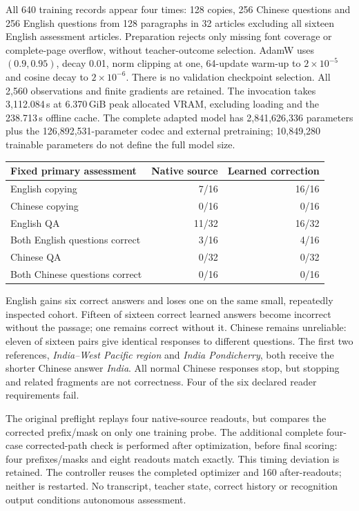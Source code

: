 All 640 training records appear four times: 128 copies, 256 Chinese questions
and 256 English questions from 128 paragraphs in 32 articles excluding all
sixteen English assessment articles. Preparation rejects only missing font
coverage or complete-page overflow, without teacher-outcome selection.
AdamW uses $(0.9,0.95)$, decay 0.01, norm clipping at one, 64-update warm-up
to $2\times10^{-5}$ and cosine decay to $2\times10^{-6}$. There is no
validation checkpoint selection. All 2,560 observations and finite gradients
are retained. The invocation takes 3,112.084\,s at 6.370\,GiB peak allocated
VRAM, excluding loading and the 238.713\,s offline cache. The complete adapted
model has 2,841,626,336 parameters plus the 126,892,531-parameter codec and
external pretraining; 10,849,280 trainable parameters do not define the full
model size.

\begin{center}\small
\begin{tabular}{lrr}
\toprule
Fixed primary assessment & Native source & Learned correction\\
\midrule
English copying & 7/16 & 16/16\\
Chinese copying & 0/16 & 0/16\\
English QA & 11/32 & 16/32\\
Both English questions correct & 3/16 & 4/16\\
Chinese QA & 0/32 & 0/32\\
Both Chinese questions correct & 0/16 & 0/16\\
\bottomrule
\end{tabular}
\end{center}
English gains six correct answers and loses one on the same small, repeatedly
inspected cohort. Fifteen of sixteen correct learned answers become incorrect
without the passage; one remains correct without it. Chinese remains
unreliable: eleven of sixteen pairs give identical responses to different
questions. The first two references, \emph{India--West Pacific region} and
\emph{India Pondicherry}, both receive the shorter Chinese answer \emph{India}.
All normal Chinese responses stop, but stopping and related fragments are
not correctness. Four of the six declared reader requirements fail.

The original preflight replays four native-source readouts, but compares the
corrected prefix/mask on only one training probe. The additional complete
four-case corrected-path check is performed after optimization, before final
scoring: four prefixes/masks and eight readouts match exactly. This timing
deviation is retained. The controller reuses the completed optimizer and
160 after-readouts; neither is restarted. No transcript, teacher state,
correct history or recognition output conditions autonomous assessment.

